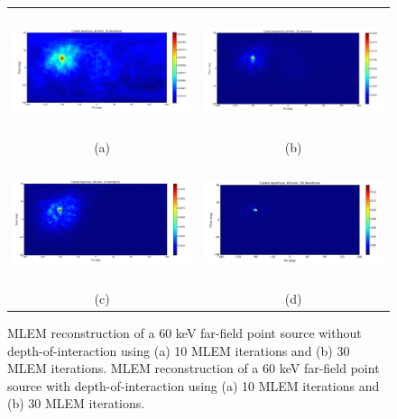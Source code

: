 \documentclass[10pt]{article}
\begin{document}
\begin{figure}[htb!]
\hypertarget{fig4}{}
\centering
\begin{tabular}{cc}
	\includegraphics[height=100pt]{Figures/MLEM_60_noDOI_HP912_10itr.png} & 
	\includegraphics[height=100pt]{Figures/MLEM_60_noDOI_HP912_30itr.png} \\ [-0.5ex]
	\scriptsize{(a)} & \scriptsize{(b)} \\ [1ex]
	\includegraphics[height=100pt]{Figures/MLEM_60_DOI_HP912_10itr.png} & 
	\includegraphics[height=100pt]{Figures/MLEM_60_DOI_HP912_30itr.png} \\ [-0.5ex]
	\scriptsize{(c)} & \scriptsize{(d)} \\[-5pt]
\end{tabular}
\caption{MLEM reconstruction of a 60 keV far-field point source without depth-of-interaction using (a) 10 MLEM iterations and (b) 30 MLEM iterations. MLEM reconstruction of a 60 keV far-field point source with depth-of-interaction using (a) 10 MLEM iterations and (b) 30 MLEM iterations. }
\end{figure}
\end{document}
